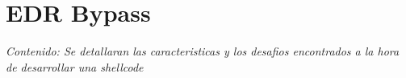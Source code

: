 \chapter{EDR Bypass}

\textit{Contenido: Se detallaran las caracteristicas y los desafios encontrados
a la hora de desarrollar una shellcode}
\vspace{1em}



